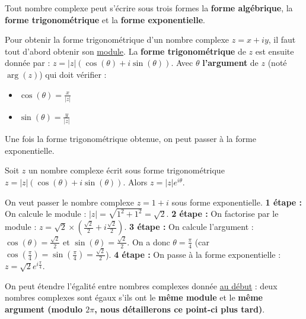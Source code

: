 	Tout nombre complexe peut s'écrire sous trois formes la \textbf{forme algébrique}, la \textbf{forme trigonométrique} et la \textbf{forme exponentielle}.

	\begin{formula}
		Pour obtenir la forme trigonométrique d'un nombre complexe $z = x + iy$, il faut tout d'abord obtenir son \hyperref[module]{module}. La \textbf{forme trigonométrique} de $z$ est ensuite donnée par : $z = |z| (\cos(\theta) + i\sin(\theta))$.
		\newpar
		Avec $\theta$ \textbf{l'argument} de $z$ (noté $\operatorname{arg}(z)$) qui doit vérifier :
		\begin{itemize}
			\item $\cos(\theta) = \frac{x}{|z|}$
			\item $\sin(\theta) = \frac{y}{|z|}$
		\end{itemize}
	\end{formula}

	Une fois la forme trigonométrique obtenue, on peut passer à la forme exponentielle.

	\begin{formula}
		Soit $z$ un nombre complexe écrit sous forme trigonométrique $z = |z| (\cos(\theta) + i\sin(\theta))$. Alors $z = |z| e^{i\theta}$.
	\end{formula}

	\begin{tip}[Exemple]
		On veut passer le nombre complexe $z = 1 + i$ sous forme exponentielle.
		\newpar
		\textbf{1\iere{} étape :} On calcule le module : $|z| = \sqrt{1^2 + 1^2} = \sqrt{2}$.
		\newpar
		\textbf{2\ieme{} étape :} On factorise par le module : $z = \sqrt{2} \times (\frac{\sqrt{2}}{2} + i\frac{\sqrt{2}}{2})$.
		\newpar
		\textbf{3\ieme{} étape :} On calcule l'argument : $\cos(\theta) = \frac{\sqrt{2}}{2}$ et $\sin(\theta) = \frac{\sqrt{2}}{2}$.
		On a donc $\theta = \frac{\pi}{4}$ (car $\cos(\frac{\pi}{4}) = \sin(\frac{\pi}{4}) = \frac{\sqrt{2}}{2}$).
		\newpar
		\textbf{4\ieme{} étape :} On passe à la forme exponentielle : $z = \sqrt{2} e^{i\frac{\pi}{4}}$.
	\end{tip}

	On peut étendre l'égalité entre nombres complexes donnée \hyperref[egalite]{au début} : deux nombres complexes sont égaux s'ils ont le \textbf{même module} et le \textbf{même argument (modulo $2\pi$, nous détaillerons ce point-ci plus tard)}.

